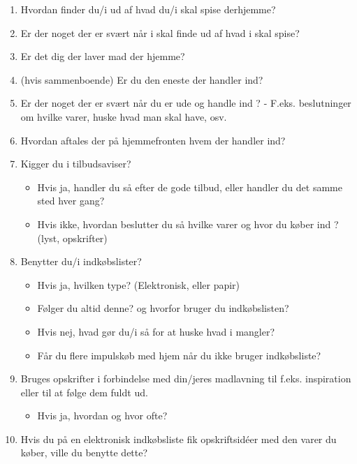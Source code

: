 \begin{enumerate}[topsep=0ex]
	\setlength{\itemsep}{0em}
	\item  Hvordan finder du/i ud af hvad du/i skal spise derhjemme?
	\item  Er der noget der er svært når i skal finde ud af hvad i skal spise?
	\item  Er det dig der laver mad der hjemme?
	\item (hvis sammenboende) Er du den eneste der handler ind?
	\item Er der noget der er svært når du er ude og handle ind ? - F.eks. beslutninger om hvilke varer, huske hvad man skal have, osv.
	\item Hvordan aftales der på hjemmefronten hvem der handler ind?
	
	\item Kigger du i tilbudsaviser?
	\begin{itemize}
		\item Hvis ja, handler du så efter de gode tilbud, eller handler du det samme sted hver gang?
		\item Hvis ikke, hvordan beslutter du så hvilke varer og hvor du køber ind ? (lyst, opskrifter)
	\end{itemize}
	
	\item Benytter du/i indkøbslister?
	\begin{itemize}
	\item Hvis ja, hvilken type? (Elektronisk, eller papir)
	\item Følger du altid denne? og hvorfor bruger du indkøbslisten?
	\item Hvis nej, hvad gør du/i så for at huske hvad i mangler?
	\item Får du flere impulskøb med hjem når du ikke bruger indkøbsliste?
	\end{itemize}
	
	\item Bruges opskrifter i forbindelse med din/jeres madlavning til f.eks. inspiration eller til at følge dem fuldt ud.
	\begin{itemize}
	\item Hvis ja, hvordan og hvor ofte?
	\end{itemize}
	
	\item Hvis du på en elektronisk indkøbsliste fik opskriftsidéer med den varer du køber, ville du benytte dette?
\end{enumerate}		   


















 


